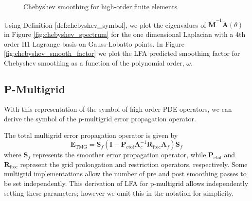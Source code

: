\documentclass[review]{siamart190516}
\begin{document}
\begin{figure}[!tbp]
  \centering
  \hfill
  \caption{Chebyshev smoothing for high-order finite elements}
\end{figure}

Using Definition \ref{def:chebyshev_symbol}, we plot the eigenvalues of $\tilde{\mathbf{M}}^{-1} \tilde{\mathbf{A}} \left( \theta \right)$ in Figure \ref{fig:chebyshev_spectrum} for the one dimensional Laplacian with a 4th order H1 Lagrange basis on Gauss-Lobatto points.
In Figure \ref{fig:chebyshev_smooth_factor} we plot the LFA predicted smoothing factor for Chebyshev smoothing as a function of the polynomial order, $\omega$.

\subsection{P-Multigrid}\label{sec:multigrid}

With this representation of the symbol of high-order PDE operators, we can derive the symbol of the p-multigrid error propagation operator.

The total multigrid error propagation operator is given by
\begin{equation}
\mathbf{E}_{\text{TMG}} = \mathbf{S}_f \left( \mathbf{I} - \mathbf{P}_{\text{ctof}} \mathbf{A}_c^{-1} \mathbf{R}_{\text{ftoc}} \mathbf{A}_f \right) \mathbf{S}_f
\end{equation}
where $\mathbf{S}_f$ represents the smoother error propagation operator, while $\mathbf{P}_{\text{ctof}}$ and $\mathbf{R}_{\text{ftoc}}$ represent the grid prolongation and restriction operators, respectively.
Some multigrid implementations allow the number of pre and post smoothing passes to be set independently.
This derivation of LFA for p-multigrid allows independently setting these parameters; however we omit this in the notation for simplicity.
\end{document}

